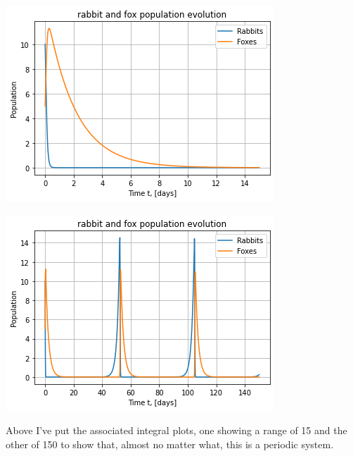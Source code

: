 \documentclass[11pt]{article}
\begin{document}
\begin{enumerate}
            \begin{minipage}[t]{0.5\linewidth}
                \begin{center}
                    \includegraphics[width=.9\linewidth]{output1.png}
                \end{center}
            \end{minipage}%
            \begin{minipage}[t]{0.5\linewidth}
                \begin{center}
                    \includegraphics[width=.9\linewidth]{output3.png}
                \end{center}
            \end{minipage}

            Above I've put the associated integral plots, one showing a range
            of 15 and the other of 150 to show that, almost no matter what,
            this is a periodic system. 


\end{enumerate}
\end{document}
